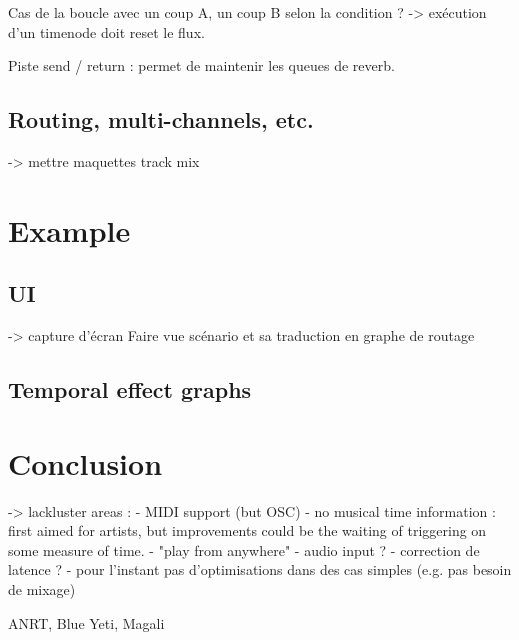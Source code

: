 \documentclass{article}
\begin{document}
Cas de la boucle avec un coup A, un coup B selon la condition ? 
-> exécution d'un timenode doit reset le flux.

Piste send / return : permet de maintenir les queues de reverb.


\subsection{Routing, multi-channels, etc.}
-> mettre maquettes track mix

\section{Example}
\subsection{UI}
-> capture d'écran
Faire vue scénario et sa traduction en graphe de routage 

\subsection{Temporal effect graphs}
\section{Conclusion}
-> lackluster areas : 
- MIDI support (but OSC)
- no musical time information : first aimed for artists, 
but improvements could be the waiting of triggering on some measure of time.
- "play from anywhere"
- audio input ?
- correction de latence ?
- pour l'instant pas d'optimisations dans des cas simples (e.g. pas besoin de mixage)
\begin{acknowledgments}
    ANRT, Blue Yeti, Magali
\end{acknowledgments} 


\end{document}
